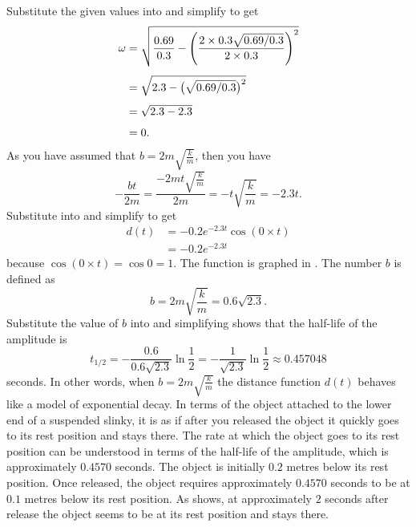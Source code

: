 \documentclass[a4paper,oneside,12pt]{article}
\begin{document}
\begin{problem}
{\begin{solution}
Substitute the given values into
 and simplify to get
\begin{align*}
\omega
&=
\sqrt{
  \frac{0.69}{0.3}
  -
  \parenthesis*{
    \frac{
      2 \times 0.3 \sqrt{0.69 / 0.3}
    }{
      2 \times 0.3
    }
  }^2
} \\[4pt]
&=
\sqrt{
  2.3
  -
  \bigparen{\sqrt{0.69 / 0.3}}^2
} \\[4pt]
&=
\sqrt{
  2.3
  -
  2.3
} \\[4pt]
&=
0.
\end{align*}
As you have assumed that $b = 2m \sqrt{\frac{k}{m}}$, then you have
\[
-\frac{bt}{2m}
=
\frac{
  -2mt \sqrt{\frac{k}{m}}
}{
  2m
}
=
-t \sqrt{\frac{k}{m}}
=
-2.3 t.
\]
Substitute into  and simplify
to get
\begin{equation}
\label{eqn:trigonometric:damped_critically_damped}
\begin{aligned}
d(t)
&=
-0.2 e^{-2.3 t} \cos(0 \times t) \\[4pt]
&=
-0.2 e^{-2.3 t}
\end{aligned}
\end{equation}
because $\cos(0 \times t) = \cos 0 = 1$.  The function is graphed in
.  The number $b$ is
defined as
\[
b
=
2m \sqrt{\frac{k}{m}}
=
0.6 \sqrt{2.3}.
\]
Substitute the value of $b$ into
 and simplifying
shows that the half-life of the amplitude is
\[
t_{1/2}
=
-\frac{0.6}{0.6 \sqrt{2.3}} \ln\frac{1}{2}
=
-\frac{1}{\sqrt{2.3}} \ln\frac{1}{2}
\approx
0.457048
\]
seconds.  In other words, when $b = 2m\sqrt{\frac{k}{m}}$ the distance
function $d(t)$ behaves like a model of exponential decay.  In terms
of the object attached to the lower end of a suspended slinky, it is
as if after you released the object it quickly goes to its rest
position and stays there.  The rate at which the object goes to its
rest position can be understood in terms of the half-life of the
amplitude, which is approximately $0.4570$ seconds.  The object is
initially $0.2$ metres below its rest position.  Once released, the
object requires approximately $0.4570$ seconds to be at $0.1$ metres
below its rest position.  As
 shows, at approximately
$2$ seconds after release the object seems to be at its rest position
and stays there.
\end{solution}
}{}


\end{problem}
\end{document}
